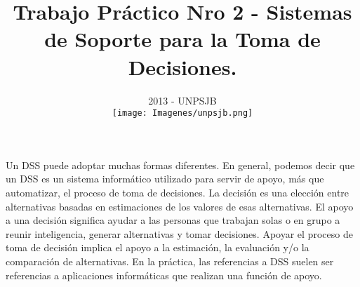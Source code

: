 \documentclass{article}
\begin{document}
\begin{large}
\title{\bf {Trabajo Práctico Nro 2 - Sistemas de Soporte para la Toma de Decisiones.}}
\end{large}
\date{2013 - UNPSJB\\[1cm]\texttt{[image: Imagenes/unpsjb.png]}}

\maketitle
\newpage


Un DSS puede adoptar muchas formas diferentes. En general, podemos decir que un DSS es un sistema informático utilizado para servir de apoyo, más que automatizar, el proceso de toma de decisiones. La decisión es una elección entre alternativas basadas en estimaciones de los valores de esas alternativas. El apoyo a una decisión significa ayudar a las personas que trabajan solas o en grupo a reunir inteligencia, generar alternativas y tomar decisiones. Apoyar el proceso de toma de decisión implica el apoyo a la estimación, la evaluación y/o la comparación de alternativas. En la práctica, las referencias a DSS suelen ser referencias a aplicaciones informáticas que realizan una función de apoyo.
\end{document}
